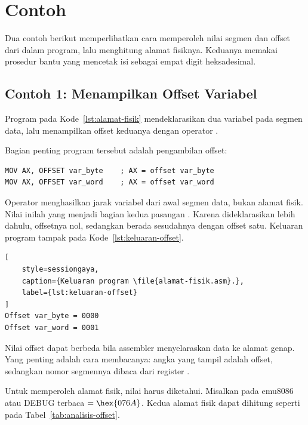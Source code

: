 \section{Contoh}
\label{sec:contoh-program}

Dua contoh berikut memperlihatkan cara memperoleh nilai segmen dan
offset dari dalam program, lalu menghitung alamat fisiknya. Keduanya
memakai prosedur bantu  yang mencetak isi 
sebagai empat digit heksadesimal.

\subsection{Contoh 1: Menampilkan Offset Variabel}

Program pada Kode~\ref{lst:alamat-fisik} mendeklarasikan dua variabel
pada segmen data, lalu menampilkan offset keduanya dengan operator
.



Bagian penting program tersebut adalah pengambilan offset:

\begin{lstlisting}[language=MASM, numbers=none]
MOV AX, OFFSET var_byte    ; AX = offset var_byte
MOV AX, OFFSET var_word    ; AX = offset var_word
\end{lstlisting}

Operator  menghasilkan jarak variabel dari awal segmen
data, bukan alamat fisik. Nilai inilah yang menjadi bagian kedua
pasangan . Karena  dideklarasikan
lebih dahulu, offsetnya nol, sedangkan  berada
sesudahnya dengan offset satu. Keluaran program tampak pada
Kode~\ref{lst:keluaran-offset}.

\begin{lstlisting}[
    style=sessiongaya,
    caption={Keluaran program \file{alamat-fisik.asm}.},
    label={lst:keluaran-offset}
]
Offset var_byte = 0000
Offset var_word = 0001
\end{lstlisting}

Nilai offset dapat berbeda bila assembler menyelaraskan data ke
alamat genap. Yang penting adalah cara membacanya: angka yang tampil
adalah offset, sedangkan nomor segmennya dibaca dari register
.

Untuk memperoleh alamat fisik, nilai  harus diketahui.
Misalkan pada emu8086 atau DEBUG terbaca  $= \hex{076A}$.
Kedua alamat fisik dapat dihitung seperti pada
Tabel~\ref{tab:analisis-offset}.

